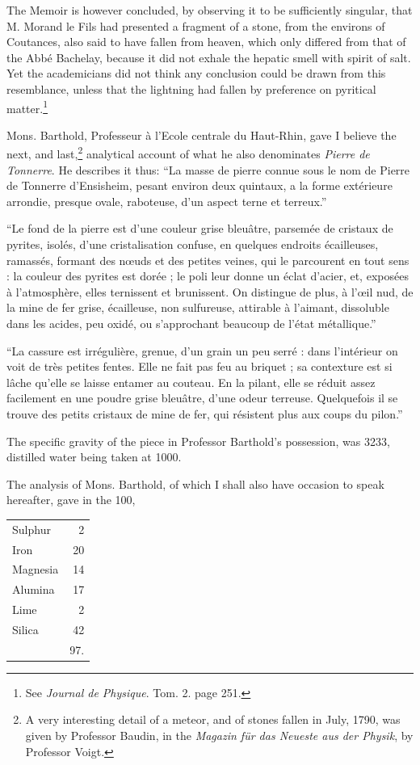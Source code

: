 \documentclass[a4paper, 12pt, oneside, twocolumn]{article}
\begin{document}
The Memoir is however concluded, by observing it to be sufficiently singular, that M. Morand le Fils had presented a fragment of a stone, from the environs of Coutances, also said to have fallen from heaven, which only differed from that of the Abbé Bachelay, because it did not exhale the hepatic smell with spirit of salt. Yet the academicians did not think any conclusion could be drawn from this resemblance, unless that the lightning had fallen by preference on pyritical matter.\footnote{See \emph{Journal de Physique}. Tom. 2. page 251.}

Mons. Barthold, Professeur à l'Ecole centrale du Haut-Rhin, gave I believe the next, and last,\footnote{A very interesting detail of a meteor, and of stones fallen in July, 1790, was given by Professor Baudin, in the \emph{Magazin für das Neueste aus der Physik}, by Professor Voigt.} analytical account of what he also denominates \emph{Pierre de Tonnerre}. He describes it thus: ``La masse de pierre connue sous le nom de Pierre de Tonnerre d'Ensisheim, pesant environ deux quintaux, a la forme extérieure arrondie, presque ovale, raboteuse, d'un aspect terne et terreux.''

``Le fond de la pierre est d'une couleur grise bleuâtre, parsemée de cristaux de pyrites, isolés, d'une cristalisation confuse, en quelques endroits écailleuses, ramassés, formant des nœuds et des petites veines, qui le parcourent en tout sens : la couleur des pyrites est dorée ; le poli leur donne un éclat d'acier, et, exposées à l'atmosphère, elles ternissent et brunissent. On distingue de plus, à l'œil nud, de la mine de fer grise, écailleuse, non sulfureuse, attirable à l'aimant, dissoluble dans les acides, peu oxidé, ou s'approchant beaucoup de l'état métallique.''

``La cassure est irrégulière, grenue, d'un grain un peu serré : dans l'intérieur on voit de très petites fentes. Elle ne fait pas feu au briquet ; sa contexture est si lâche qu'elle se laisse entamer au couteau. En la pilant, elle se réduit assez facilement en une poudre grise bleuâtre, d'une odeur terreuse. Quelquefois il se trouve des petits cristaux de mine de fer, qui résistent plus aux coups du pilon.''

The specific gravity of the piece in Professor Barthold's possession, was 3233, distilled water being taken at 1000.

The analysis of Mons. Barthold, of which I shall also have occasion to speak hereafter, gave in the 100,
\begin{table}[H]
    \centering\bfseries
    \begin{tabular}{l r}
        Sulphur & 2 \\
        Iron & 20 \\ 
        Magnesia & 14 \\ 
        Alumina & 17 \\ 
        Lime & 2 \\ 
        Silica & 42 \\ \hline
        ~ & 97. \\ 
    \end{tabular}
\end{table}
\end{document}
